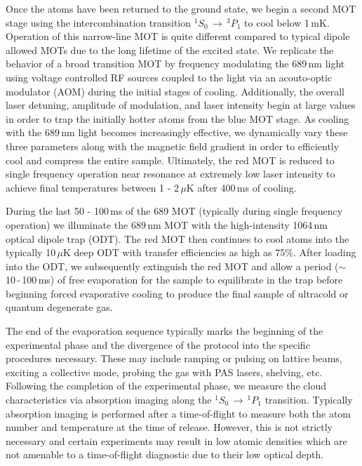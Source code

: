 Once the atoms have been returned to the ground state, we begin a second MOT stage using the intercombination transition $^1S_0\,\rightarrow\,^3P_1$ to cool below 1\,mK.
Operation of this narrow-line MOT is quite different compared to typical dipole allowed MOTs due to the long lifetime of the excited state.
We replicate the behavior of a broad transition MOT by frequency modulating the 689\,nm light using voltage controlled RF sources coupled to the light via an acouto-optic modulator (AOM) during the initial stages of cooling.
Additionally, the overall laser detuning, amplitude of modulation, and laser intensity begin at large values in order to trap the initially hotter atoms from the blue MOT stage. 
As cooling with the 689\,nm light becomes increasingly effective, we dynamically vary these three parameters along with the magnetic field gradient in order to efficiently cool and compress the entire sample.
Ultimately, the red MOT is reduced to single frequency operation near resonance at extremely low laser intensity to achieve final temperatures between 1 - 2\,$\mu$K after 400\,ms of cooling.

During the last 50 - 100\,ms of the 689 MOT (typically during single frequency operation) we illuminate the $689\,$nm MOT with the high-intensity 1064\,nm optical dipole trap (ODT).
The red MOT then continues to cool atoms into the typically 10\,$\mu$K deep ODT with transfer efficiencies as high as 75\%. 
After loading into the ODT, we subsequently extinguish the red MOT and allow a period ($\sim$10\,-\,100\,ms) of free evaporation for the sample to equilibrate in the trap before beginning forced evaporative cooling to produce the final sample of ultracold or quantum degenerate gas.

The end of the evaporation sequence typically marks the beginning of the experimental phase and the divergence of the protocol into the specific procedures necessary. 
These may include ramping or pulsing on lattice beams, exciting a collective mode, probing the gas with PAS lasers, shelving, etc. 
Following the completion of the experimental phase, we measure the cloud characteristics via absorption imaging along the $^1S_0\,\rightarrow\,^1P_1$ transition. 
Typically absorption imaging is performed after a time-of-flight to measure both the atom number and temperature at the time of release. 
However, this is not strictly necessary and certain experiments may result in low atomic densities which are not amenable to a time-of-flight diagnostic due to their low optical depth.

